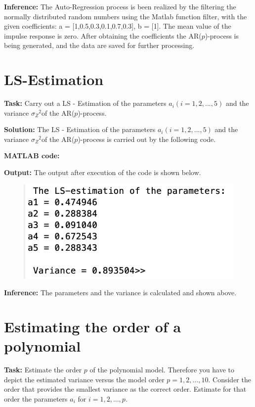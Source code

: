 \noindent \textbf{Inference:} The Auto-Regression process is been realized by the filtering the normally distributed random numbers using the Matlab function filter, with the given coefficients: a = [1,0.5,0.3,0.1,0.7,0.3], b = [1]. The mean value of the impulse response is zero.  After obtaining the coefficients the AR($p$)-process is being generated, and the data are saved for further processing.

\newpage

\section{ LS-Estimation } \label{ LS-Estimation  }
\noindent \textbf{Task:} Carry out a LS - Estimation of the parameters $a_i(i=1,2,...,5)$ and the variance ${\sigma_Z}^2$of the AR($p$)-process.

\noindent \textbf{Solution:}  
\noindent The LS - Estimation of the parameters $a_i(i=1,2,...,5)$ and the variance ${\sigma_Z}^2$of the AR($p$)-process is carried out by the following code.

\noindent \textbf{MATLAB code:}


\noindent \textbf{Output:}
\noindent The output after execution of the code is shown below. 
\begin{figure}[H]
\centering
{\includegraphics[scale=1.15]{ass3_1.png}}
\end{figure}

\noindent \textbf{Inference:} The parameters and the variance is calculated and shown above.



\section{ Estimating the order of a polynomial } \label{ Estimating the order of a polynomial}
\noindent \textbf{Task:} Estimate the order $p$ of the polynomial model. Therefore you have to depict the estimated variance versus the model order $p = 1,2,...,10.$ Consider the order that provides the smallest variance as the correct order. Estimate for that order the parameters $a_i$ for $i = 1,2,...,p.$


